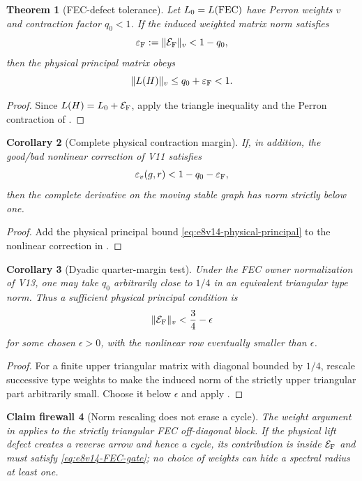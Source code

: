 \documentclass[11pt,oneside]{book}
\newtheorem{theorem}{Theorem}[chapter]
\newtheorem{corollary}[theorem]{Corollary}
\newtheorem{firewall}[theorem]{Claim firewall}
\theoremstyle{definition}
\theoremstyle{remark}
\begin{document}
\begin{theorem}[FEC-defect tolerance]
\label{thm:e8v14-tolerance}
Let \(L_0=L({\rm FEC})\) have Perron weights \(v\) and contraction
factor \(q_0<1\).  If the induced weighted matrix norm satisfies
\[
 \varepsilon_{\rm F}:=
 \|{\mathcal E}_{\rm F}\|_v<1-q_0,                 \label{eq:e8v14-FEC-gate}
\]
then the physical principal matrix obeys
\[
 \|L(H)\|_v\le q_0+\varepsilon_{\rm F}<1.           \label{eq:e8v14-physical-principal}
\]
\end{theorem}

\begin{proof}
Since \(L(H)=L_0+{\mathcal E}_{\rm F}\), apply the triangle
inequality and the Perron contraction of
.
\end{proof}

\begin{corollary}[Complete physical contraction margin]
\label{cor:e8v14-complete}
If, in addition, the good/bad nonlinear correction of V11 satisfies
\[
 \varepsilon_v(g,r)<1-q_0-\varepsilon_{\rm F},      \label{eq:e8v14-complete-gate}
\]
then the complete derivative on the moving stable graph has norm
strictly below one.
\end{corollary}

\begin{proof}
Add the physical principal bound
\eqref{eq:e8v14-physical-principal} to the nonlinear correction in
.
\end{proof}

\begin{corollary}[Dyadic quarter-margin test]
\label{cor:e8v14-quarter}
Under the FEC owner normalization of V13, one may take
\(q_0\) arbitrarily close to \(1/4\) in an equivalent triangular
type norm.  Thus a sufficient physical principal condition is
\[
 \|{\mathcal E}_{\rm F}\|_v<\frac34-\epsilon        \label{eq:e8v14-quarter-gate}
\]
for some chosen \(\epsilon>0\), with the nonlinear row eventually
smaller than \(\epsilon\).
\end{corollary}

\begin{proof}
For a finite upper triangular matrix with diagonal bounded by
\(1/4\), rescale successive type weights to make the induced norm of
the strictly upper triangular part arbitrarily small.  Choose it
below \(\epsilon\) and apply
.
\end{proof}

\begin{firewall}[Norm rescaling does not erase a cycle]
\label{fire:e8v14-cycle}
The weight argument in  applies to the
strictly triangular FEC off-diagonal block.  If the physical lift
defect creates a reverse arrow and hence a cycle, its contribution is
inside \({\mathcal E}_{\rm F}\) and must satisfy
\eqref{eq:e8v14-FEC-gate}; no choice of weights can hide a spectral
radius at least one.
\end{firewall}
\end{document}
